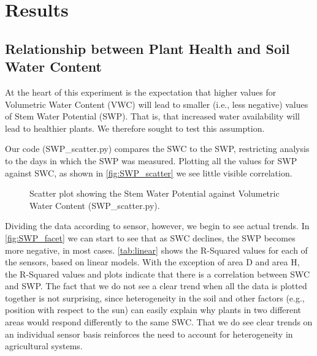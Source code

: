 \documentclass[12pt]{scrartcl}
\begin{document}
\section{Results}
\subsection{Relationship between Plant Health and Soil Water Content}\label{sec:Scatter-SWP}
At the heart of this experiment is the expectation that higher values for Volumetric Water Content (VWC) will lead to smaller (i.e., less negative) values of Stem Water Potential (SWP). That is, that increased water availability will lead to healthier plants. We therefore sought to test this assumption.

Our code (SWP\_scatter.py) compares the SWC to the SWP, restricting analysis to the days in which the SWP was measured. Plotting all the values for SWP against SWC, as shown in \autoref{fig:SWP_scatter} we see little visible correlation.

\begin{figure}[!htb]
        \caption{\label{fig:SWP_scatter} Scatter plot showing the Stem Water Potential against Volumetric Water Content (SWP\_scatter.py).}
\end{figure}

Dividing the data according to sensor, however, we begin to see actual trends. In \autoref{fig:SWP_facet} we can start to see that as SWC declines, the SWP becomes more negative, in most cases. \autoref{tab:linear} shows the R-Squared values for each of the sensors, based on linear models. With the exception of area D and area H, the R-Squared values and plots indicate that there is a correlation between SWC and SWP. The fact that we do not see a clear trend when all the data is plotted together is not surprising, since heterogeneity in the soil and other factors (e.g., position with respect to the sun) can easily explain why plants in two different areas would respond differently to the same SWC. That we do see clear trends on an individual sensor basis reinforces the need to account for heterogeneity in agricultural systems.
\end{document}
